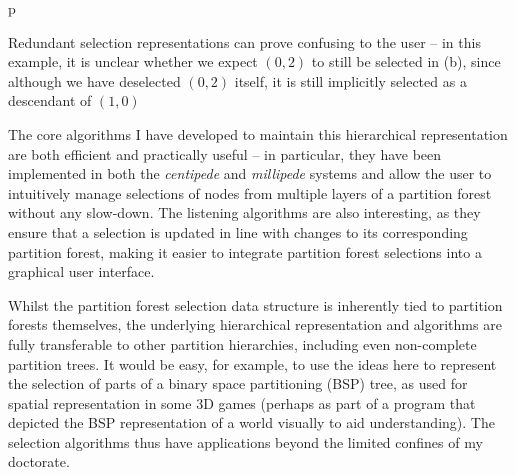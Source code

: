 \begin{stusubfig}{p}
	\hspace{4mm}%
\caption[Redundant selection representations can prove confusing to the user]{Redundant selection representations can prove confusing to the user -- in this example, it is unclear whether we expect $(0,2)$ to still be selected in (b), since although we have deselected $(0,2)$ itself, it is still implicitly selected as a descendant of $(1,0)$}
\label{fig:criticalassessment-selection-redundancy}
\end{stusubfig}

The core algorithms I have developed to maintain this hierarchical representation are both efficient and practically useful -- in particular, they have been implemented in both the \emph{centipede} and \emph{millipede} systems and allow the user to intuitively manage selections of nodes from multiple layers of a partition forest without any slow-down. The listening algorithms are also interesting, as they ensure that a selection is updated in line with changes to its corresponding partition forest, making it easier to integrate partition forest selections into a graphical user interface.

Whilst the partition forest selection data structure is inherently tied to partition forests themselves, the underlying hierarchical representation and algorithms are fully transferable to other partition hierarchies, including even non-complete partition trees. It would be easy, for example, to use the ideas here to represent the selection of parts of a binary space partitioning (BSP) tree, as used for spatial representation in some 3D games (perhaps as part of a program that depicted the BSP representation of a world visually to aid understanding). The selection algorithms thus have applications beyond the limited confines of my doctorate.

